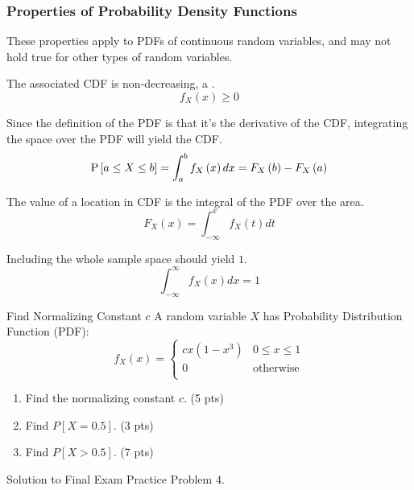 		\subsubsection{Properties of Probability Density Functions} \label{subsubsec:Properties of Probability Density Functions}
			These properties apply to PDFs of continuous random variables, and may not hold true for other types of random variables.
			\begin{propertylist}
				\item The associated CDF is non-decreasing, a .
					\begin{equation}
						f_{X} \left( x \right) \geq 0
					\end{equation}
				\item Since the definition of the PDF is that it's the derivative of the CDF, integrating the space over the PDF will yield the CDF.
					\begin{equation}
						\operatorname{\operatorname{P}} \left[ a \leq X \leq b \right] = \int_{a}^{b} f_{X} \left( x \right) dx = F_{X} \left( b \right) - F_{X} \left( a \right)
					\end{equation}
				\item The value of a location in CDF is the integral of the PDF over the area.
					\begin{equation}
						F_{X} \left( x \right) = \int_{-\infty}^{x} f_{X} \left( t \right) dt
					\end{equation}
				\item Including the whole sample space should yield $1$.
					\begin{equation}
						\int_{-\infty}^{\infty} f_{X} \left( x \right) dx = 1
					\end{equation}
			\end{propertylist}
					\begin{example}{Find Normalizing Constant $c$}
						A random variable $X$ has Probability Distribution Function (PDF):
						\begin{equation*}
							f_{X}\left( x \right) = \begin{cases}
								cx \left( 1- x^{3} \right) & 0 \leq x \leq 1 \\
								0 & \text{otherwise} \\
								\end{cases}
							\end{equation*}
						\begin{enumerate}
							\item Find the normalizing constant $c$. (5 pts)
							\item Find $P \left[ X = 0.5 \right]$. (3 pts)
							\item Find $P \left[ X > 0.5 \right]$. (7 pts)
						\end{enumerate}

						\tcblower

						Solution to Final Exam Practice Problem 4.
					\end{example}
